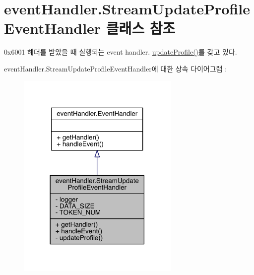 \hypertarget{classevent_handler_1_1_stream_update_profile_event_handler}{\section{event\+Handler.\+Stream\+Update\+Profile\+Event\+Handler 클래스 참조}
\label{classevent_handler_1_1_stream_update_profile_event_handler}
}


0x6001 헤더를 받았을 때 실행되는 event handler. \hyperlink{classevent_handler_1_1_stream_update_profile_event_handler_a888b80c6db463e195fe9ebefc39c721e}{update\+Profile()}를 갖고 있다.  




event\+Handler.\+Stream\+Update\+Profile\+Event\+Handler에 대한 상속 다이어그램 \+: 
\nopagebreak
\begin{figure}[H]
\begin{center}
\leavevmode
\includegraphics[width=222pt]{classevent_handler_1_1_stream_update_profile_event_handler__inherit__graph}
\end{center}
\end{figure}


